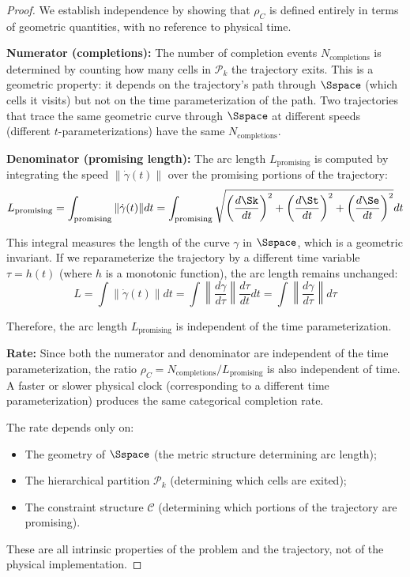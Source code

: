 \begin{proof}
We establish independence by showing that $\rho_C$ is defined entirely in terms of geometric quantities, with no reference to physical time.

\textbf{Numerator (completions):} The number of completion events $N_{\text{completions}}$ is determined by counting how many cells in $\mathcal{P}_k$ the trajectory exits. This is a geometric property: it depends on the trajectory's path through $\Sspace$ (which cells it visits) but not on the time parameterization of the path. Two trajectories that trace the same geometric curve through $\Sspace$ at different speeds (different $t$-parameterizations) have the same $N_{\text{completions}}$.

\textbf{Denominator (promising length):} The arc length $L_{\text{promising}}$ is computed by integrating the speed $\|\dot{\gamma}(t)\|$ over the promising portions of the trajectory:
\begin{equation}
L_{\text{promising}} = \int_{\text{promising}} \|\dot{\gamma}(t)\| dt = \int_{\text{promising}} \sqrt{\left(\frac{d\Sk}{dt}\right)^2 + \left(\frac{d\St}{dt}\right)^2 + \left(\frac{d\Se}{dt}\right)^2} dt
\end{equation}

This integral measures the length of the curve $\gamma$ in $\Sspace$, which is a geometric invariant. If we reparameterize the trajectory by a different time variable $\tau = h(t)$ (where $h$ is a monotonic function), the arc length remains unchanged:
\begin{equation}
L = \int \|\dot{\gamma}(t)\| dt = \int \left\|\frac{d\gamma}{d\tau}\right\| \frac{d\tau}{dt} dt = \int \left\|\frac{d\gamma}{d\tau}\right\| d\tau
\end{equation}

Therefore, the arc length $L_{\text{promising}}$ is independent of the time parameterization.

\textbf{Rate:} Since both the numerator and denominator are independent of the time parameterization, the ratio $\rho_C = N_{\text{completions}} / L_{\text{promising}}$ is also independent of time. A faster or slower physical clock (corresponding to a different time parameterization) produces the same categorical completion rate.

The rate depends only on:
\begin{itemize}
    \item The geometry of $\Sspace$ (the metric structure determining arc length);
    \item The hierarchical partition $\mathcal{P}_k$ (determining which cells are exited);
    \item The constraint structure $\mathcal{C}$ (determining which portions of the trajectory are promising).
\end{itemize}

These are all intrinsic properties of the problem and the trajectory, not of the physical implementation.
\end{proof}

